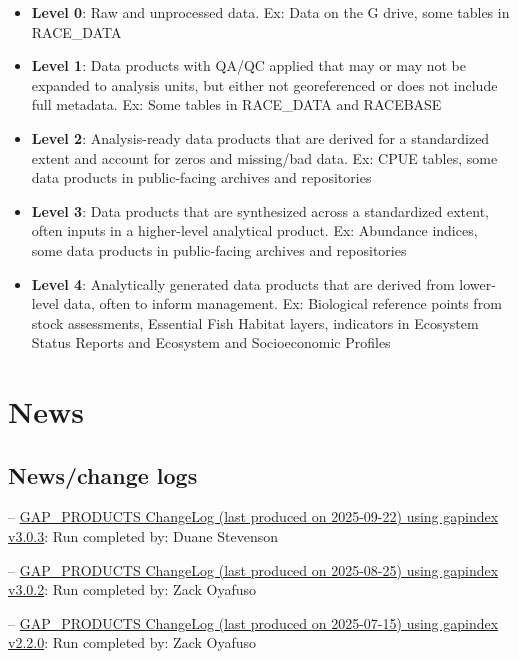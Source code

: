 \documentclass[
  letterpaper,
  oneside,
  open=any]{scrbook}
\providecommand{\tightlist}{%
  \setlength{\itemsep}{0pt}\setlength{\parskip}{0pt}}\usepackage{longtable,booktabs,array}
\begin{document}
\begin{itemize}
\tightlist
\item
  \textbf{Level 0}: Raw and unprocessed data. Ex: Data on the G drive,
  some tables in RACE\_DATA
\item
  \textbf{Level 1}: Data products with QA/QC applied that may or may not
  be expanded to analysis units, but either not georeferenced or does
  not include full metadata. Ex: Some tables in RACE\_DATA and RACEBASE
\item
  \textbf{Level 2}: Analysis-ready data products that are derived for a
  standardized extent and account for zeros and missing/bad data. Ex:
  CPUE tables, some data products in public-facing archives and
  repositories
\item
  \textbf{Level 3}: Data products that are synthesized across a
  standardized extent, often inputs in a higher-level analytical
  product. Ex: Abundance indices, some data products in public-facing
  archives and repositories
\item
  \textbf{Level 4}: Analytically generated data products that are
  derived from lower-level data, often to inform management. Ex:
  Biological reference points from stock assessments, Essential Fish
  Habitat layers, indicators in Ecosystem Status Reports and Ecosystem
  and Socioeconomic Profiles
\end{itemize}

\chapter{News}\label{news}

\section{News/change logs}\label{newschange-logs}

--
\href{https://raw.githubusercontent.com/afsc-gap-products/gap_products/main/content/intro-news/2025-09-22.txt}{GAP\_PRODUCTS
ChangeLog (last produced on 2025-09-22) using gapindex v3.0.3}: Run
completed by: Duane Stevenson

--
\href{https://raw.githubusercontent.com/afsc-gap-products/gap_products/main/content/intro-news/2025-08-25.txt}{GAP\_PRODUCTS
ChangeLog (last produced on 2025-08-25) using gapindex v3.0.2}: Run
completed by: Zack Oyafuso

--
\href{https://raw.githubusercontent.com/afsc-gap-products/gap_products/main/content/intro-news/2025-07-15.txt}{GAP\_PRODUCTS
ChangeLog (last produced on 2025-07-15) using gapindex v2.2.0}: Run
completed by: Zack Oyafuso
\end{document}
